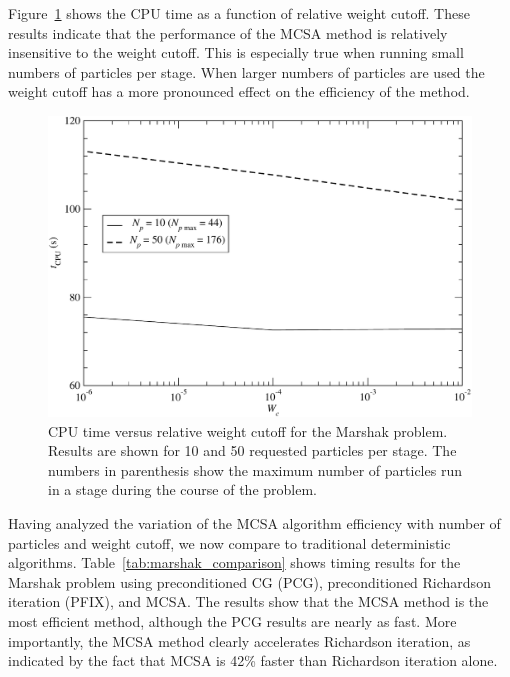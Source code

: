 \documentclass[preprint,12pt]{elsarticle}
\begin{document}
Figure~\ref{fig:CPU_wc} shows the CPU time as a function of relative
weight cutoff.  These results indicate that the performance of the
MCSA method is relatively insensitive to the weight cutoff.  This is
especially true when running small numbers of particles per stage.
When larger numbers of particles are used the weight cutoff has a more
pronounced effect on the efficiency of the method.

\begin{figure}[htpb!]
  \centerline{
    \includegraphics[width=5in,clip]{mrshk_wc_CPU.pdf}}
  \caption{
    CPU time versus relative weight cutoff for the Marshak problem.
    Results are shown for 10 and 50 requested particles per stage.
    The numbers in parenthesis show the maximum number of particles
    run in a stage during the course of the problem.}
  \label{fig:CPU_wc}
\end{figure}

Having analyzed the variation of the MCSA algorithm efficiency with
number of particles and weight cutoff, we now compare to traditional
deterministic algorithms.  Table~\ref{tab:marshak_comparison} shows
timing results for the Marshak problem using preconditioned CG (PCG),
preconditioned Richardson iteration (PFIX), and MCSA. The results show
that the MCSA method is the most efficient method, although the PCG
results are nearly as fast.  More importantly, the MCSA method clearly
accelerates Richardson iteration, as indicated by the fact that MCSA
is 42\% faster than Richardson iteration alone.
\end{document}
